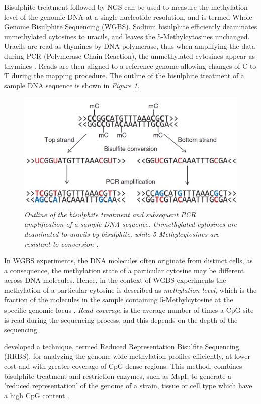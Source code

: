 Bisulphite treatment \citep{Frommer1992} followed by NGS can be used to measure the methylation level of the genomic DNA at a single-nucleotide resolution, and is termed Whole-Genome Bisulphite Sequencing (WGBS). Sodium bisulphite efficiently deaminates unmethylated cytosines to uracils, and leaves the 5-Methylcytosines unchanged. Uracils are read as thymines by DNA polymerase, thus when amplifying the data during PCR (Polymerase Chain Reaction), the unmethylated cytosines appear as thymines \citep{Krueger2012}. Reads are then aligned to a reference genome allowing changes of C to T during the mapping procedure. 
The outline of the bisulphite treatment of a sample DNA sequence is shown in \emph{Figure \ref{bisulphite-pic}}.
\begin{figure}[!ht]
	\begin{center}
 		\includegraphics[scale = 0.43]{images/bis-treatment.png}
		\caption{\emph{Outline of the bisulphite treatment and subsequent PCR amplification of a sample DNA sequence. Unmethylated cytosines are deaminated to uracils by bisulphite, while 5-Methylcytosines are resistant to conversion \citep{Krueger2012}.}}
		\label{bisulphite-pic}
	\end{center}
\end{figure} 

In WGBS experiments, the DNA molecules often originate from distinct cells, as a consequence, the methylation state of a particular cytosine may be different across DNA molecules. Hence, in the context of WGBS experiments the methylation of a particular cytosine is described as \emph{methylation level}, which is the fraction of the molecules in the sample containing 5-Methylcytosine at the specific genomic locus \citep{Schultz2012}. \emph{Read coverage} is the average number of times a CpG site is read during the sequencing process, and this depends on the depth of the sequencing.

\cite{Meissner2005} developed a technique, termed Reduced Representation Bisulfite Sequencing (RRBS), for analyzing the genome-wide methylation profiles efficiently, at lower cost and with greater coverage of CpG dense regions. This method, combines bisulphite treatment and restriction enzymes, such as MspI, to generate a 'reduced representation' of the genome of a strain, tissue or cell type which have a high CpG content \citep{Meissner2005}. 


